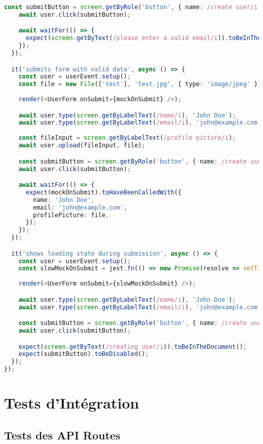 \begin{lstlisting}[language=TypeScript, caption=Tests de composants React]
    const submitButton = screen.getByRole('button', { name: /create user/i });
    await user.click(submitButton);

    await waitFor(() => {
      expect(screen.getByText(/please enter a valid email/i)).toBeInTheDocument();
    });
  });

  it('submits form with valid data', async () => {
    const user = userEvent.setup();
    const file = new File(['test'], 'test.jpg', { type: 'image/jpeg' });
    
    render(<UserForm onSubmit={mockOnSubmit} />);

    await user.type(screen.getByLabelText(/name/i), 'John Doe');
    await user.type(screen.getByLabelText(/email/i), 'john@example.com');
    
    const fileInput = screen.getByLabelText(/profile picture/i);
    await user.upload(fileInput, file);

    const submitButton = screen.getByRole('button', { name: /create user/i });
    await user.click(submitButton);

    await waitFor(() => {
      expect(mockOnSubmit).toHaveBeenCalledWith({
        name: 'John Doe',
        email: 'john@example.com',
        profilePicture: file,
      });
    });
  });

  it('shows loading state during submission', async () => {
    const user = userEvent.setup();
    const slowMockOnSubmit = jest.fn(() => new Promise(resolve => setTimeout(resolve, 1000)));
    
    render(<UserForm onSubmit={slowMockOnSubmit} />);

    await user.type(screen.getByLabelText(/name/i), 'John Doe');
    await user.type(screen.getByLabelText(/email/i), 'john@example.com');

    const submitButton = screen.getByRole('button', { name: /create user/i });
    await user.click(submitButton);

    expect(screen.getByText(/creating user/i)).toBeInTheDocument();
    expect(submitButton).toBeDisabled();
  });
});
\end{lstlisting}

\section{Tests d'Intégration}

\subsection{Tests des API Routes}

